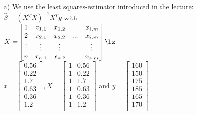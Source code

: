 


\begin{enumerate}
\item[a)] We use the least squares-estimator introduced in the lecture:
\lz
$\hat{\beta} = (X^TX)^{-1}X^Ty$  with \\ $ X = \begin{bmatrix}
1 & x_{1,1} & x_{1,2} & ... & x_{1,m} \\
2 & x_{2,1} & x_{2,2} & ... & x_{2,m} \\
\vdots & \vdots & \vdots & ... & \vdots \\
n & x_{n,1} & x_{n,2} & ... & x_{n,m} \\
\end{bmatrix}
\lz
$  \\
$ x =  \begin{bmatrix}
0.56  \\
0.22  \\
1.7  \\
0.63  \\
0.36  \\
1.2  \\
\end{bmatrix}, X =  \begin{bmatrix}
1 & 0.56  \\
1 & 0.22  \\
1 & 1.7  \\
1 & 0.63  \\
1 & 0.36  \\
1 & 1.2  \\
\end{bmatrix}
$
and
 $
y =  \begin{bmatrix}
160  \\
150  \\
175  \\
185  \\
165  \\
170  \\
\end{bmatrix}
$


\end{enumerate}
